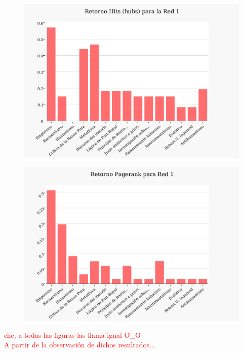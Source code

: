 \documentclass[a4paper]{article}
\begin{document}
\begin{figure}
  \begin{center}
	\includegraphics[scale=0.66]{imagenes/Exp1/hitsH1}
	\label{hitsh1}
  \end{center}
\end{figure}

\begin{figure}
  \begin{center}
	\includegraphics[scale=0.66]{imagenes/Exp1/PR1}
	\label{fig:pr1}
  \end{center}
\end{figure}
\textcolor{red}{che, a todas las figuras las llama igual O_O}\\
\textcolor{red}{A partir de la observación de dichos resultados...}\\
\end{document}
